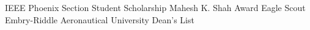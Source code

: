 \documentclass[../Gabriel_Roper_Resume]{subfiles}
\begin{document}
    \Entry IEEE Phoenix Section Student Scholarship Mahesh K. Shah Award
    \Entry Eagle Scout
    \Entry Embry-Riddle Aeronautical University Dean's List
\end{document}
